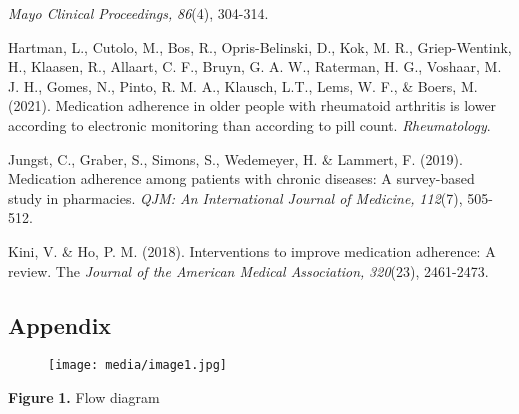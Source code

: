 \documentclass{article}
\begin{document}
\emph{Mayo Clinical Proceedings, }\emph{86}(4), 304-314.

Hartman, L., Cutolo, M., Bos, R., Opris-Belinski, D., Kok, M. R., Griep-Wentink, H., Klaasen, R., Allaart, C. F., Bruyn, G. A. W., Raterman, H. G., Voshaar, M. J. H., Gomes, N., Pinto, R. M. A., Klausch, L.T., Lems, W. F., \& Boers, M. (2021). Medication adherence in older people with rheumatoid arthritis is lower according to electronic monitoring than according to pill count. \emph{Rheumatology}.

Jungst, C., Graber, S., Simons, S., Wedemeyer, H. \& Lammert, F. (2019). Medication adherence among patients with chronic diseases: A survey-based study in pharmacies. \emph{QJM: An International Journal of Medicine, }\emph{112}(7), 505-512.

Kini, V. \& Ho, P. M. (2018). Interventions to improve medication adherence: A review. The \emph{Journal of the American Medical Association, }\emph{320}(23), 2461-2473.



\subsection{Appendix}


\begin{figure}

  \texttt{[image: media/image1.jpg]}
\caption{}
\label{}


\end{figure}


\textbf{Figure}\textbf{ 1.} Flow diagram
\end{document}
